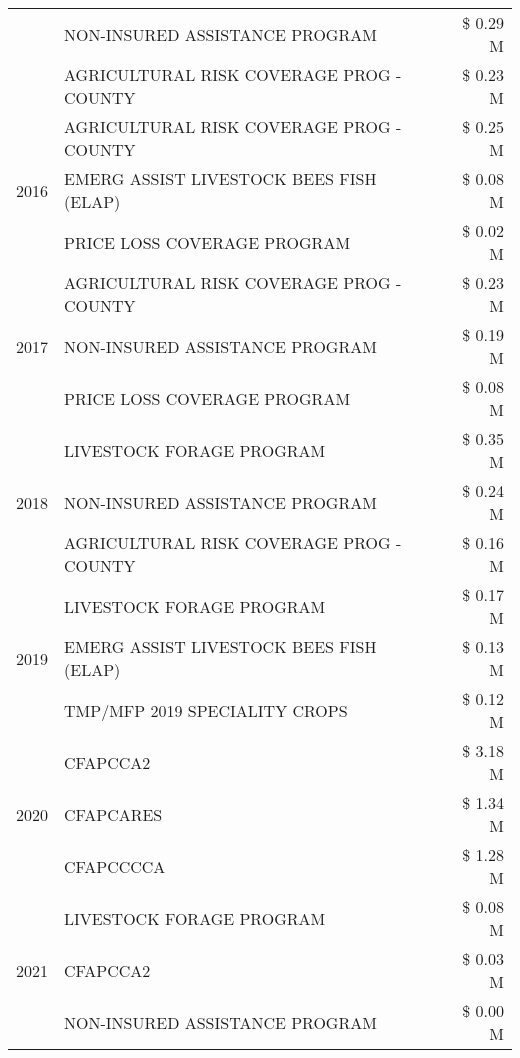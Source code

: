 \begin{tabular}{llr}
 & NON-INSURED ASSISTANCE PROGRAM & \$ 0.29 M \\
 & AGRICULTURAL RISK COVERAGE PROG - COUNTY & \$ 0.23 M \\
\cline{1-3}
\multirow[t]{3}{*}{2016} & AGRICULTURAL RISK COVERAGE PROG - COUNTY      & \$ 0.25 M \\
 & EMERG ASSIST LIVESTOCK BEES FISH (ELAP)       & \$ 0.08 M \\
 & PRICE LOSS COVERAGE PROGRAM                   & \$ 0.02 M \\
\cline{1-3}
\multirow[t]{3}{*}{2017} & AGRICULTURAL RISK COVERAGE PROG - COUNTY & \$ 0.23 M \\
 & NON-INSURED ASSISTANCE PROGRAM & \$ 0.19 M \\
 & PRICE LOSS COVERAGE PROGRAM & \$ 0.08 M \\
\cline{1-3}
\multirow[t]{3}{*}{2018} & LIVESTOCK FORAGE PROGRAM & \$ 0.35 M \\
 & NON-INSURED ASSISTANCE PROGRAM & \$ 0.24 M \\
 & AGRICULTURAL RISK COVERAGE PROG - COUNTY & \$ 0.16 M \\
\cline{1-3}
\multirow[t]{3}{*}{2019} & LIVESTOCK FORAGE PROGRAM & \$ 0.17 M \\
 & EMERG ASSIST LIVESTOCK BEES FISH (ELAP) & \$ 0.13 M \\
 & TMP/MFP 2019 SPECIALITY CROPS & \$ 0.12 M \\
\cline{1-3}
\multirow[t]{3}{*}{2020} & CFAPCCA2 & \$ 3.18 M \\
 & CFAPCARES & \$ 1.34 M \\
 & CFAPCCCCA & \$ 1.28 M \\
\cline{1-3}
\multirow[t]{3}{*}{2021} & LIVESTOCK FORAGE PROGRAM & \$ 0.08 M \\
 & CFAPCCA2 & \$ 0.03 M \\
 & NON-INSURED ASSISTANCE PROGRAM & \$ 0.00 M \\
\cline{1-3}
\bottomrule
\end{tabular}
